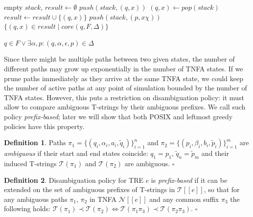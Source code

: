 \documentclass{article}
\newcommand{\Xset}{\!\leftarrow\!}
\newcommand{\Xin}{\!\in\!}
\newcommand{\Xeq}{\!=\!}
\newcommand{\Xlb}{[\![}
\newcommand{\Xrb}{]\!]}
\newcommand{\XN}{\mathcal{N}}
\newcommand{\XT}{\mathcal{T}}
\theoremstyle{definition}
\newtheorem{Xdef}{Definition}
\begin{document}
\begin{multicols}{2}
    \begin{algorithm}[H] \DontPrintSemicolon {} 
     {
        empty $stack$, $result \Xset \emptyset$ \;
        \For {$(q, x) \Xin X:$} {
            $push(stack, (q, x))$ \;
        }
         {
            $(q, x) \Xset pop(stack)$ \;
            $result \Xset result \cup \{(q, x)\}$ \;
            \ForEach {outgoing arc $(q, \epsilon, \chi, p) \Xin \Delta$} {
                \If {$\not \exists (\widetilde{p}, \widetilde{x})$ on stack $: \widetilde{p} \Xeq p$} {
                    $push(stack, (p, x \chi))$ \;
                }
            }
        }
        \Return $\{ (q, x) \Xin result \mid core(q, F, \Delta) \}$ \;
    }
    \end{algorithm}

    \begin{algorithm}[H] \DontPrintSemicolon {} 
     {
        \Return $q \Xin F \vee \exists \alpha, p: (q, \alpha, \epsilon, p) \Xin \Delta$
    }
    \end{algorithm}

Since there might be multiple paths between two given states,
the number of different paths may grow up exponentially in the number of TNFA states.
If we prune paths immediately as they arrive at the same TNFA state,
we could keep the number of active paths at any point of simulation bounded by the number of TNFA states.
However, this puts a restriction on disambiguation policy:
it must allow to compare ambiguous T-strings by their ambiguous prefixes.
We call such policy \emph{prefix-based};
later we will show that both POSIX and leftmost greedy policies have this property.

    \begin{Xdef}
    Paths
    $\pi_1 \Xeq \{(q_i, \alpha_i, a_i, \widetilde{q}_i)\}_{i=1}^n$ and
    $\pi_2 \Xeq \{(p_i, \beta_i, b_i, \widetilde{p}_i)\}_{i=1}^m$
    are \emph{ambiguous} if their start and end states coincide: $q_1 \Xeq p_1$, $\widetilde{q}_n \Xeq \widetilde{p}_m$
    and their induced T-strings $\XT(\pi_1)$ and $\XT(\pi_2)$ are ambiguous.
    $\square$
    \end{Xdef}

    \begin{Xdef}
    Disambiguation policy for TRE $e$ is \emph{prefix-based}
    if it can be extended on the set of ambiguous prefixes of T-strings in $\XT \Xlb e \Xrb$,
    so that for any ambiguous paths $\pi_1 $, $\pi_2 $ in TNFA $\XN \Xlb e \Xrb$
    and any common suffix $\pi_3$ the following holds:
    $\XT(\pi_1) \prec \XT(\pi_2) \Leftrightarrow \XT(\pi_1 \pi_3) \prec \XT(\pi_2 \pi_3)$.
    $\square$
    \end{Xdef}


\end{multicols}
\end{document}
